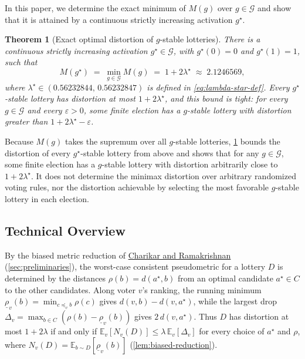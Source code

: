 \documentclass[11pt]{article}
\newcommand{\citelink}[2]{%
  \hyperlink{cite.#2}{\textcolor{CitationBlue}{#1}}%
}
\numberwithin{equation}{section}
\theoremstyle{plain}
\newtheorem{theorem}{Theorem}[section]
\theoremstyle{definition}
\newcommand{\E}{\mathbb{E}}
\newcommand{\1}{\mathbf{1}}
\newcommand{\lowrho}{\underline{\rho}}
\newcommand{\calG}{\mathcal{G}}
\begin{document}
In this paper, we determine the exact minimum of $M(g)$ over $g \in \calG$ and show that it is attained by a continuous strictly increasing activation $g^\star$.

\begin{theorem}[Exact optimal distortion of $g$-stable lotteries]
\label{thm:main}
There is a continuous strictly increasing activation $g^\star \in \calG$, with $g^\star(0) = 0$ and $g^\star(1) = 1$, such that
\[
  M(g^\star) \;=\; \min_{g \in \calG} M(g) \;=\; 1 + 2\lambda^\star \;\approx\; 2.1246569,
\]
where $\lambda^\star \in (0.56232844,\, 0.56232847)$ is defined in \cref{eq:lambda-star-def}. Every $g^\star$-stable lottery has distortion at most $1 + 2\lambda^\star$, and this bound is tight: for every $g \in \calG$ and every $\varepsilon > 0$, some finite election has a $g$-stable lottery with distortion greater than $1 + 2\lambda^\star - \varepsilon$.
\end{theorem}

Because $M(g)$ takes the supremum over all $g$-stable lotteries, \cref{thm:main} bounds the distortion of every $g^\star$-stable lottery from above and shows that for any $g \in \calG$, some finite election has a $g$-stable lottery with distortion arbitrarily close to $1 + 2\lambda^\star$. It does not determine the minimax distortion over arbitrary randomized voting rules, nor the distortion achievable by selecting the most favorable $g$-stable lottery in each election.

\subsection{Technical Overview}
\label{sec:overview}

By the biased metric reduction of \citelink{Charikar and Ramakrishnan}{CharikarRamakrishnan22}~\cite{CharikarRamakrishnan22} (\cref{sec:preliminaries}), the worst-case consistent pseudometric for a lottery $D$ is determined by the distances $\rho(b) = d(a^\star, b)$ from an optimal candidate $a^\star \in C$ to the other candidates. Along voter $v$'s ranking, the running minimum $\lowrho_v(b) = \min_{c \preceq_v b} \rho(c)$ gives $d(v, b) - d(v, a^\star)$, while the largest drop $\Delta_v = \max_{b \in C}(\rho(b) - \lowrho_v(b))$ gives $2\,d(v, a^\star)$. Thus $D$ has distortion at most $1 + 2\lambda$ if and only if $\E_v[N_v(D)] \le \lambda\,\E_v[\Delta_v]$ for every choice of $a^\star$ and $\rho$, where $N_v(D) = \E_{b \sim D}[\lowrho_v(b)]$ (\cref{lem:biased-reduction}).
\end{document}
